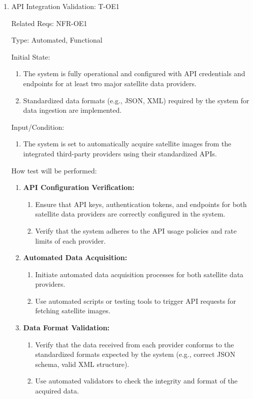 \documentclass[12pt, titlepage]{article}
\begin{document}
\begin{enumerate}

\item{API Integration Validation: T-OE1\\}

Related Reqs: NFR-OE1

Type: Automated, Functional

Initial State:
\begin{enumerate}
    \item The system is fully operational and configured with API credentials and endpoints for at least two major satellite data providers.
    \item Standardized data formats (e.g., JSON, XML) required by the system for data ingestion are implemented.
\end{enumerate}
Input/Condition:
\begin{enumerate}
    \item The system is set to automatically acquire satellite images from the integrated third-party providers using their standardized APIs.
\end{enumerate}
How test will be performed:
\begin{enumerate}
    \item \textbf{API Configuration Verification:}
    \begin{enumerate}
        \item Ensure that API keys, authentication tokens, and endpoints for both satellite data providers are correctly configured in the system.
        \item Verify that the system adheres to the API usage policies and rate limits of each provider.
    \end{enumerate}
    
    \item \textbf{Automated Data Acquisition:}
    \begin{enumerate}
        \item Initiate automated data acquisition processes for both satellite data providers.
        \item Use automated scripts or testing tools to trigger API requests for fetching satellite images.
    \end{enumerate}
    
    \item \textbf{Data Format Validation:}
    \begin{enumerate}
        \item Verify that the data received from each provider conforms to the standardized formats expected by the system (e.g., correct JSON schema, valid XML structure).
        \item Use automated validators to check the integrity and format of the acquired data.
    \end{enumerate}
    

\end{enumerate}
\end{enumerate}
\end{document}
